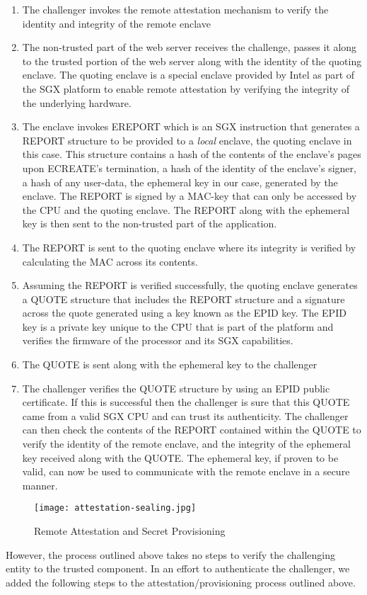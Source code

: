 \documentclass[../main.tex]{subfiles}
\begin{document}
\begin{enumerate}
	\item The challenger invokes the remote attestation mechanism to verify the identity and integrity of the remote enclave
	\item The non-trusted part of the web server receives the challenge, passes it along to the trusted portion of the web server
	      along with the identity of the quoting enclave. The quoting enclave is a special enclave provided by Intel as part of the SGX
	      platform to enable remote attestation by verifying the integrity of the underlying hardware. %
	\item The enclave invokes EREPORT which is an SGX instruction that generates a REPORT structure to be provided to a \textit{local} enclave, the quoting enclave in this case.
	      This structure contains a hash of the contents of the enclave's pages upon ECREATE's termination, a hash of the identity of the enclave's signer, a hash of any user-data, the ephemeral key in our case,
	      generated by the enclave. The REPORT is signed by a MAC-key that can only be accessed by the CPU and the quoting enclave. The REPORT along with the ephemeral key is then sent to the non-trusted part of the application.
	\item The REPORT is sent to the quoting enclave where its integrity is verified by calculating the MAC across its contents. 
	\item Assuming the REPORT is verified successfully, the quoting enclave generates a QUOTE structure that includes the REPORT structure and a signature across
	      the quote generated using a key known as the EPID key. %
	      The EPID key is a private key unique to the CPU that is part of the platform and verifies the firmware of the processor and its SGX capabilities. 
	\item The QUOTE is sent along with the ephemeral key to the challenger
	\item The challenger verifies the QUOTE structure by using an EPID public certificate. If this is successful then the challenger is sure that this QUOTE came from a valid SGX CPU and can trust
	      its authenticity. The challenger can then check the contents of the REPORT contained within the QUOTE to verify the identity of the remote enclave, and the integrity of the ephemeral key 
	      received along with the QUOTE. The ephemeral key, if proven to be valid, can now be used to communicate with the remote enclave in a secure manner.  
\end{enumerate}
		
\begin{figure}[H]
	\centering
	\texttt{[image: attestation-sealing.jpg]}
	\caption{Remote Attestation and Secret Provisioning}
	\label{fig:attest}
\end{figure}

However, the process outlined above takes no steps to verify the challenging entity to the trusted component. In an effort to authenticate the
challenger, we added the following steps to the attestation/provisioning process outlined above.  
\end{document}
